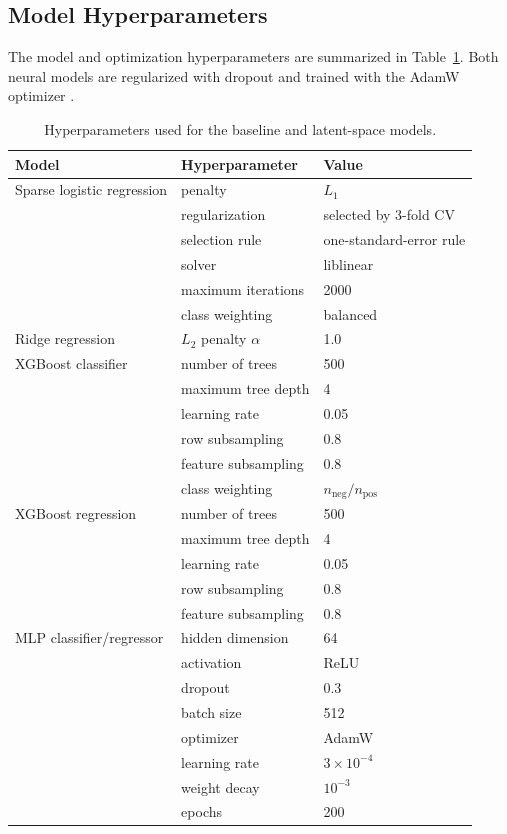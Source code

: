 \subsection{Model Hyperparameters}

The model and optimization hyperparameters are summarized in Table~\ref{tab:model_hyperparameters}. Both neural models are
regularized with dropout \citep{srivastava2014} and trained with the AdamW optimizer \citep{loshchilov2019}.

\begin{table}[htbp]
\centering
\caption{Hyperparameters used for the baseline and latent-space models.}
\label{tab:model_hyperparameters}
\begin{tabular}{lll}
\hline
\textbf{Model} & \textbf{Hyperparameter} & \textbf{Value} \\
\hline

Sparse logistic regression
& penalty & \(L_1\) \\
& regularization & selected by 3-fold CV \\
& selection rule & one-standard-error rule \\
& solver & liblinear \\
& maximum iterations & 2000 \\
& class weighting & balanced \\
\hline

Ridge regression
& \(L_2\) penalty \(\alpha\) & 1.0 \\
\hline

XGBoost classifier
& number of trees & 500 \\
& maximum tree depth & 4 \\
& learning rate & 0.05 \\
& row subsampling & 0.8 \\
& feature subsampling & 0.8 \\
& class weighting & \(n_{\mathrm{neg}}/n_{\mathrm{pos}}\) \\
\hline

XGBoost regression
& number of trees & 500 \\
& maximum tree depth & 4 \\
& learning rate & 0.05 \\
& row subsampling & 0.8 \\
& feature subsampling & 0.8 \\
\hline

MLP classifier/regressor
& hidden dimension & 64 \\
& activation & ReLU \\
& dropout & 0.3 \\
& batch size & 512 \\
& optimizer & AdamW \\
& learning rate & \(3\times10^{-4}\) \\
& weight decay & \(10^{-3}\) \\
& epochs & 200 \\
\hline


\end{tabular}
\end{table}

